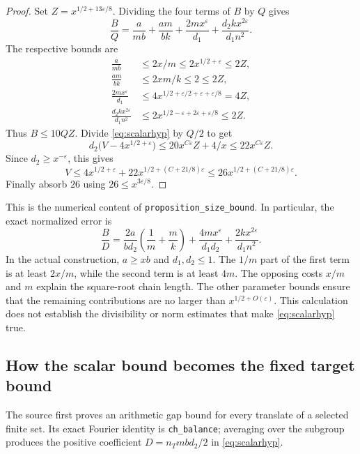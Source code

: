 \documentclass[11pt,a4paper]{article}
\numberwithin{equation}{section}
\theoremstyle{remark}\newtheorem{remark}[theorem]{Remark}
\begin{document}
\begin{proof}
Set $Z=x^{1/2+13\varepsilon/8}$. Dividing the four terms of $B$ by $Q$ gives
\[
\frac{B}{Q}=\frac{a}{mb}+\frac{am}{bk}
                  +\frac{2mx^\varepsilon}{d_1}
                  +\frac{d_2kx^{2\varepsilon}}{d_1n^2}.
\]
The respective bounds are
\begin{align*}
\frac{a}{mb}&\le 2x/m\le2x^{1/2+\varepsilon}\le2Z,\\
\frac{am}{bk}&\le2xm/k\le2\le2Z,\\
\frac{2mx^\varepsilon}{d_1}&\le4x^{1/2+\varepsilon/2+\varepsilon+\varepsilon/8}=4Z,\\
\frac{d_2kx^{2\varepsilon}}{d_1n^2}
&\le2x^{1/2-\varepsilon+2\varepsilon+\varepsilon/8}\le2Z.
\end{align*}
Thus $B\le10QZ$. Divide \eqref{eq:scalarhyp} by $Q/2$ to get
\[
d_2\bigl(V-4x^{1/2+\varepsilon}\bigr)
       \le20x^{C\varepsilon}Z+4/x\le22x^{C\varepsilon}Z.
\]
Since $d_2\ge x^{-\varepsilon}$, this gives
\[
V\le4x^{1/2+\varepsilon}
       +22x^{1/2+(C+21/8)\varepsilon}
\le26x^{1/2+(C+21/8)\varepsilon}.
\]
Finally absorb $26$ using $26\le x^{3\varepsilon/8}$.
\end{proof}

This is the numerical content of \texttt{proposition\_size\_bound}.\cite{size}
In particular, the exact normalized error is
\begin{equation}\label{eq:balance}
\boxed{\frac{B}{D}=\frac{2a}{bd_2}\left(\frac1m+\frac{m}{k}\right)
  +\frac{4mx^\varepsilon}{d_1d_2}
  +\frac{2kx^{2\varepsilon}}{d_1n^2}.}
\end{equation}
In the actual construction, $a\ge xb$ and $d_1,d_2\le1$. The $1/m$ part of the first term is at least $2x/m$, while the second term is at least $4m$. The opposing costs $x/m$ and $m$ explain the square-root chain length. The other parameter bounds ensure that the remaining contributions are no larger than $x^{1/2+O(\varepsilon)}$. This calculation does not establish the divisibility or norm estimates that make \eqref{eq:scalarhyp} true.

\subsection{How the scalar bound becomes the fixed target bound}

The source first proves an arithmetic gap bound for every translate of a selected finite set. Its exact Fourier identity is \texttt{ch\_balance}; averaging over the subgroup produces the positive coefficient $D=n_Tmbd_2/2$ in \eqref{eq:scalarhyp}.\cite{balance,chcore}
\end{document}

